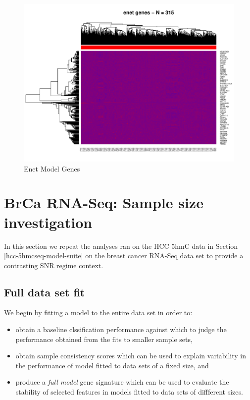 \documentclass[
]{book}
\begin{document}
\begin{figure}
\centering
\includegraphics{Static/figures/brcaRna-glmnetFit-heatmapEnet-1.pdf}
\caption{\label{fig:brcaRna-glmnetFit-heatmapEnet}Enet Model Genes}
\end{figure}

\hypertarget{brca-rnaseq-model-suite}{%
\chapter{BrCa RNA-Seq: Sample size investigation}\label{brca-rnaseq-model-suite}}

In this section we repeat the analyses ran on the HCC 5hmC data in
Section \ref{hcc-5hmcseq-model-suite} on the breast cancer
RNA-Seq data set to provide a contrasting SNR regime context.

\hypertarget{full-data-set-fit-1}{%
\section{Full data set fit}\label{full-data-set-fit-1}}

We begin by fitting a model to the entire data set in order to:

\begin{itemize}
\item
  obtain a baseline clssification performance against which to judge the performance
  obtained from the fits to smaller sample sets,
\item
  obtain sample consistency scores which can be used to explain variability
  in the performance of model fitted to data sets of a fixed size, and
\item
  produce a \emph{full model} gene signature which can be used to evaluate
  the stability of selected features in models fitted to data sets of diffferent
  sizes.
\end{itemize}
\end{document}
